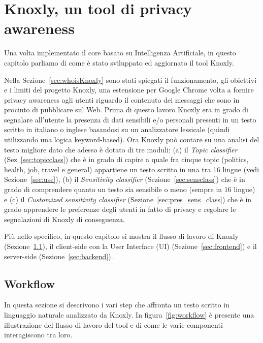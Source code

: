 \chapter{Knoxly, un tool di privacy awareness}
\label{ch:cap5}
Una volta implementato il core basato su Intelligenza Artificiale, in questo capitolo parliamo di come è stato sviluppato ed aggiornato il tool Knoxly.
 
Nella Sezione~\ref{sec:whoisKnoxly} sono stati spiegati il funzionamento, gli obiettivi e i limiti del progetto Knoxly, una estensione per Google Chrome volta a fornire privacy awareness agli utenti riguardo il contenuto dei messaggi che sono in procinto di pubblicare sul Web. Prima di questo lavoro Knoxly era in grado di segnalare all'utente la presenza di dati sensibili e/o personali presenti in un testo scritto in italiano o inglese basandosi su un analizzatore lessicale (quindi utilizzando una logica keyword-based). Ora Knoxly può contare su una analisi del testo migliore dato che adesso è dotato di tre moduli: (a) il \textit{Topic classifier} (Sez~\ref{sec:topicclass}) che è in grado di capire a quale fra cinque topic (politics, health, job, travel e general) appartiene un testo scritto in una tra 16 lingue (vedi Sezione~\ref{sec:use}), (b) il \textit{Sensitivity classifier} (Sezione~\ref{sec:sensclass}) che è in grado di comprendere quanto un testo sia sensibile o meno (sempre in 16 lingue) e (c) il \textit{Customized sensitivity classifier} (Sezione~\ref{sec:pres_sens_class}) che è in grado apprendere le preferenze degli utenti in fatto di privacy e regolare le segnalazioni di Knoxly di conseguenza.

Più nello specifico, in questo capitolo si mostra il flusso di lavoro di Knoxly (Sezione~\ref{sec:workflow}), il client-side con la User Interface (UI) (Sezione~\ref{sec:frontend}) e il server-side (Sezione~\ref{sec:backend}).

\section{Workflow}
\label{sec:workflow}
In questa sezione si descrivono i vari step che affronta un testo scritto in linguaggio naturale analizzato da Knoxly. In figura~\ref{fig:workflow} è presente una illustrazione del flusso di lavoro del tool e di come le varie componenti interagiscono tra loro.

